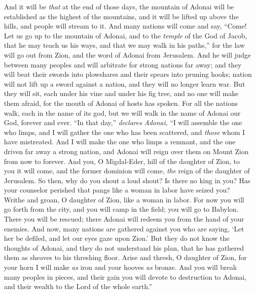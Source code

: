 \begin{biblechapter} %
 And it will be \textit{that} at the end of those days, 
the mountain of Adonai 
will be established as the highest of the mountains, 
and it will be lifted up above the hills, 
and people will stream to it.
\verse And many nations will come and say, 
“Come! Let us go up to the mountain of Adonai, 
and to the \textit{temple} of the God of Jacob, 
that he may teach us his ways, 
and that we may walk in his paths,” 
for the law will go out from Zion, 
and the word of Adonai from Jerusalem.
\verse And he will judge between many peoples 
and will arbitrate for strong nations far away; 
and they will beat their swords into plowshares 
and their spears into pruning hooks; 
nation will not lift up a sword against a nation, 
and they will no longer learn war.
\verse But they will sit, each under his vine 
and under his fig tree, 
and no one will make them afraid, 
for the mouth of Adonai of hosts has spoken.
\verse For all the nations walk, 
each in the name of its god, 
but we will walk in the name of Adonai our God, 
forever and ever.
 “In that day,” \textit{declares Adonai,} 
“I will assemble the one who limps, 
and I will gather the one who has been scattered, 
and \textit{those} whom I have mistreated.
\verse And I will make the one who limps a remnant, 
and the one driven far away a strong nation, 
and Adonai will reign over them on Mount Zion 
from now to forever.
\verse And you, O Migdal-Eder, 
hill of the daughter of Zion, 
to you it will come, 
and the former dominion will come, 
\textit{the} reign of the daughter of Jerusalem.
\verse So then, why do you shout a loud shout? 
Is there no king in you? 
Has your counselor perished 
that pangs like a woman in labor have seized you?
\verse Writhe and groan, O daughter of Zion, 
like a woman in labor. 
For now you will go forth from the city, 
and you will camp in the field; 
you will go to Babylon. 
There you will be rescued; 
there Adonai will redeem you 
from the hand of your enemies.
\verse And now, many nations are gathered against you 
who are saying, ‘Let her be defiled, 
and let our eyes gaze upon Zion.’
\verse But they do not know the thoughts of Adonai, 
and they do not understand his plan, 
that he has gathered them as sheaves 
to his threshing floor.
\verse Arise and thresh, O daughter of Zion, 
for your horn I will make \textit{as} iron 
and your hooves \textit{as} bronze. 
And you will break many peoples in pieces, 
and their gain you will devote to destruction to Adonai, 
and their wealth to the Lord of the whole earth.”
\end{biblechapter}

